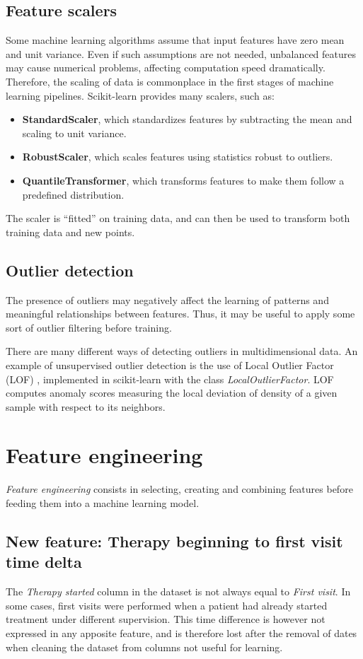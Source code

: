 \documentclass[12pt]{report}
\begin{document}
\subsection*{Feature scalers}
Some machine learning algorithms assume that input features have zero mean and unit variance. Even if such assumptions are not needed, unbalanced features may cause numerical problems, affecting computation speed dramatically. Therefore, the scaling of data is commonplace in the first stages of machine learning pipelines. Scikit-learn provides many scalers, such as:
\begin{itemize}
\item \textbf{StandardScaler}, which standardizes features by subtracting the mean and scaling to unit variance.
\item \textbf{RobustScaler}, which scales features using statistics robust to outliers.
\item \textbf{QuantileTransformer}, which transforms features to make them follow a predefined distribution.
\end{itemize}
The scaler is ``fitted'' on training data, and can then be used to transform both training data and new points.

\subsection*{Outlier detection}
The presence of outliers may negatively affect the learning of patterns and meaningful relationships between features. Thus, it may be useful to apply some sort of outlier filtering before training.

There are many different ways of detecting outliers in multidimensional data. An example of unsupervised outlier detection is the use of Local Outlier Factor (LOF) \cite{breunig00}, implemented in scikit-learn with the class \textit{LocalOutlierFactor}. LOF computes anomaly scores measuring the local deviation of density of a given sample with respect to its neighbors.

\section{Feature engineering}
\textit{Feature engineering} consists in selecting, creating and combining features before feeding them into a machine learning model.

\subsection*{New feature: Therapy beginning to first visit time delta}
The \textit{Therapy started} column in the dataset is not always equal to \textit{First visit}. In some cases, first visits were performed when a patient had already started treatment under different supervision. This time difference is however not expressed in any apposite feature, and is therefore lost after the removal of dates when cleaning the dataset from columns not useful for learning.
\end{document}
